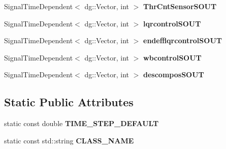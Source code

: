 \begin{DoxyCompactItemize}
\item 
Signal\+Time\+Dependent$<$ dg\+::\+Vector, int $>$ {\bfseries Thr\+Cnt\+Sensor\+S\+O\+UT}\hypertarget{classdynamicgraph_1_1sot_1_1ComImpedanceControl_a53d98df81cb5a2dcd2b493e8dcdd7fb7}{}\label{classdynamicgraph_1_1sot_1_1ComImpedanceControl_a53d98df81cb5a2dcd2b493e8dcdd7fb7}

\item 
Signal\+Time\+Dependent$<$ dg\+::\+Vector, int $>$ {\bfseries lqrcontrol\+S\+O\+UT}\hypertarget{classdynamicgraph_1_1sot_1_1ComImpedanceControl_ae7a1ce6a36b7af188b8b6d82d5443da2}{}\label{classdynamicgraph_1_1sot_1_1ComImpedanceControl_ae7a1ce6a36b7af188b8b6d82d5443da2}

\item 
Signal\+Time\+Dependent$<$ dg\+::\+Vector, int $>$ {\bfseries endefflqrcontrol\+S\+O\+UT}\hypertarget{classdynamicgraph_1_1sot_1_1ComImpedanceControl_ac8d0213a39a324f9292bff2c62965db0}{}\label{classdynamicgraph_1_1sot_1_1ComImpedanceControl_ac8d0213a39a324f9292bff2c62965db0}

\item 
Signal\+Time\+Dependent$<$ dg\+::\+Vector, int $>$ {\bfseries wbcontrol\+S\+O\+UT}\hypertarget{classdynamicgraph_1_1sot_1_1ComImpedanceControl_a75db64990cf315dd752c7569a93bac18}{}\label{classdynamicgraph_1_1sot_1_1ComImpedanceControl_a75db64990cf315dd752c7569a93bac18}

\item 
Signal\+Time\+Dependent$<$ dg\+::\+Vector, int $>$ {\bfseries descompos\+S\+O\+UT}\hypertarget{classdynamicgraph_1_1sot_1_1ComImpedanceControl_a9c1a87a218a2979a252da7ed8c12c2f1}{}\label{classdynamicgraph_1_1sot_1_1ComImpedanceControl_a9c1a87a218a2979a252da7ed8c12c2f1}

\end{DoxyCompactItemize}
\subsection*{Static Public Attributes}
\begin{DoxyCompactItemize}
\item 
static const double {\bfseries T\+I\+M\+E\+\_\+\+S\+T\+E\+P\+\_\+\+D\+E\+F\+A\+U\+LT}\hypertarget{classdynamicgraph_1_1sot_1_1ComImpedanceControl_ad065fb4f254e2c48ba3d70fb3cb2b3cb}{}\label{classdynamicgraph_1_1sot_1_1ComImpedanceControl_ad065fb4f254e2c48ba3d70fb3cb2b3cb}

\item 
static const std\+::string {\bfseries C\+L\+A\+S\+S\+\_\+\+N\+A\+ME}\hypertarget{classdynamicgraph_1_1sot_1_1ComImpedanceControl_a62e724ec127c6d67806f0e0b601a3e9f}{}\label{classdynamicgraph_1_1sot_1_1ComImpedanceControl_a62e724ec127c6d67806f0e0b601a3e9f}

\end{DoxyCompactItemize}
